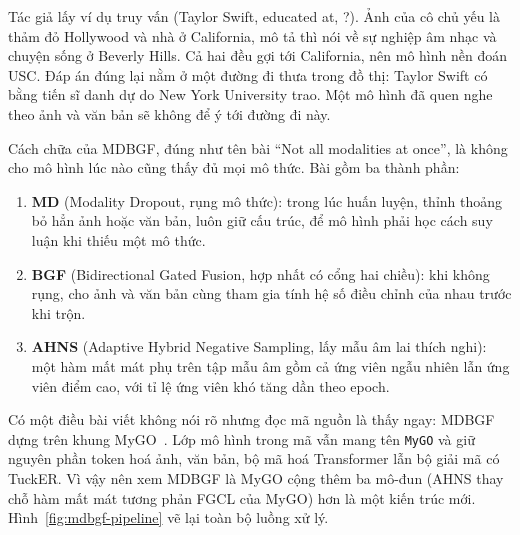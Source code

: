 \documentclass[conference,a4paper]{IEEEtran}
\begin{document}
Tác giả lấy ví dụ truy vấn (Taylor Swift, educated at, ?). Ảnh của cô chủ yếu là thảm đỏ Hollywood và nhà ở California, mô tả thì nói về sự nghiệp âm nhạc và chuyện sống ở Beverly Hills. Cả hai đều gợi tới California, nên mô hình nền đoán USC. Đáp án đúng lại nằm ở một đường đi thưa trong đồ thị: Taylor Swift có bằng tiến sĩ danh dự do New York University trao. Một mô hình đã quen nghe theo ảnh và văn bản sẽ không để ý tới đường đi này.

Cách chữa của MDBGF, đúng như tên bài ``Not all modalities at once'', là không cho mô hình lúc nào cũng thấy đủ mọi mô thức. Bài gồm ba thành phần:
\begin{enumerate}
\item \textbf{MD} (Modality Dropout, rụng mô thức): trong lúc huấn luyện, thỉnh thoảng bỏ hẳn ảnh hoặc văn bản, luôn giữ cấu trúc, để mô hình phải học cách suy luận khi thiếu một mô thức.
\item \textbf{BGF} (Bidirectional Gated Fusion, hợp nhất có cổng hai chiều): khi không rụng, cho ảnh và văn bản cùng tham gia tính hệ số điều chỉnh của nhau trước khi trộn.
\item \textbf{AHNS} (Adaptive Hybrid Negative Sampling, lấy mẫu âm lai thích nghi): một hàm mất mát phụ trên tập mẫu âm gồm cả ứng viên ngẫu nhiên lẫn ứng viên điểm cao, với tỉ lệ ứng viên khó tăng dần theo epoch.
\end{enumerate}

Có một điều bài viết không nói rõ nhưng đọc mã nguồn là thấy ngay: MDBGF dựng trên khung MyGO~\cite{mygo}. Lớp mô hình trong mã vẫn mang tên \texttt{MyGO} và giữ nguyên phần token hoá ảnh, văn bản, bộ mã hoá Transformer lẫn bộ giải mã có TuckER. Vì vậy nên xem MDBGF là MyGO cộng thêm ba mô-đun (AHNS thay chỗ hàm mất mát tương phản FGCL của MyGO) hơn là một kiến trúc mới. Hình~\ref{fig:mdbgf-pipeline} vẽ lại toàn bộ luồng xử lý.
\end{document}
